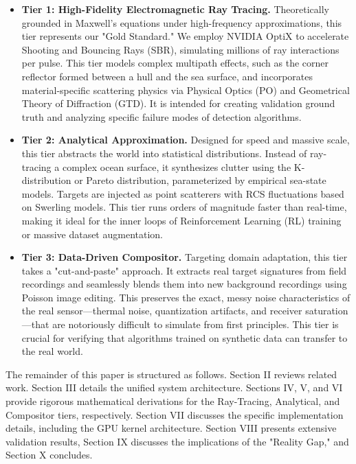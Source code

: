\documentclass[conf]{new-aiaa}
\begin{document}
\begin{itemize}
    \item \textbf{Tier 1: High-Fidelity Electromagnetic Ray Tracing.} Theoretically grounded in Maxwell's equations under high-frequency approximations, this tier represents our "Gold Standard." We employ NVIDIA OptiX to accelerate Shooting and Bouncing Rays (SBR), simulating millions of ray interactions per pulse. This tier models complex multipath effects, such as the corner reflector formed between a hull and the sea surface, and incorporates material-specific scattering physics via Physical Optics (PO) and Geometrical Theory of Diffraction (GTD). It is intended for creating validation ground truth and analyzing specific failure modes of detection algorithms.
    
    \item \textbf{Tier 2: Analytical Approximation.} Designed for speed and massive scale, this tier abstracts the world into statistical distributions. Instead of ray-tracing a complex ocean surface, it synthesizes clutter using the K-distribution or Pareto distribution, parameterized by empirical sea-state models. Targets are injected as point scatterers with RCS fluctuations based on Swerling models. This tier runs orders of magnitude faster than real-time, making it ideal for the inner loops of Reinforcement Learning (RL) training or massive dataset augmentation.
    
    \item \textbf{Tier 3: Data-Driven Compositor.} Targeting domain adaptation, this tier takes a "cut-and-paste" approach. It extracts real target signatures from field recordings and seamlessly blends them into new background recordings using Poisson image editing. This preserves the exact, messy noise characteristics of the real sensor—thermal noise, quantization artifacts, and receiver saturation—that are notoriously difficult to simulate from first principles. This tier is crucial for verifying that algorithms trained on synthetic data can transfer to the real world.
\end{itemize}

The remainder of this paper is structured as follows. Section II reviews related work. Section III details the unified system architecture. Sections IV, V, and VI provide rigorous mathematical derivations for the Ray-Tracing, Analytical, and Compositor tiers, respectively. Section VII discusses the specific implementation details, including the GPU kernel architecture. Section VIII presents extensive validation results, Section IX discusses the implications of the "Reality Gap," and Section X concludes.
\end{document}
